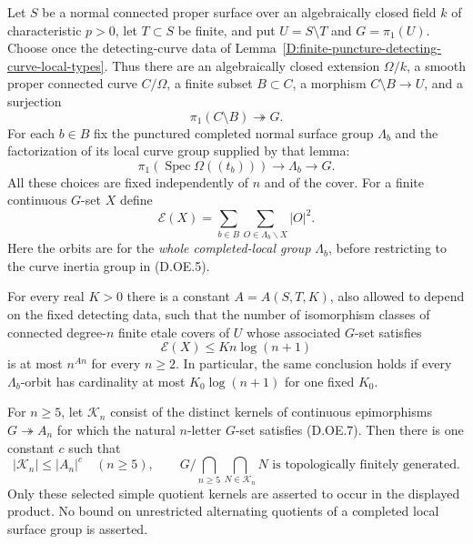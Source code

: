 \begin{theorem}
\label{D:finite-puncture-local-orbit-factorial-count}
Let $S$ be a normal connected proper surface over an algebraically
closed field $k$ of characteristic $p>0$, let $T\subset S$ be finite,
and put $U=S\setminus T$ and $G=\pi_1(U)$.
Choose once the detecting-curve data of
Lemma~\ref{D:finite-puncture-detecting-curve-local-types}.
Thus there are an algebraically closed extension $\Omega/k$, a smooth
proper connected curve $C/\Omega$, a finite subset $B\subset C$,
a morphism $C\setminus B\to U$, and a surjection
\[
                       \pi_1(C\setminus B)\twoheadrightarrow G.
                                                               \tag{D.OE.4}
\]
For each $b\in B$ fix the punctured completed normal surface group
$\Lambda_b$ and the factorization of its local curve group supplied
by that lemma:
\[
 \pi_1(\operatorname{Spec}\Omega((t_b)))
                      \longrightarrow\Lambda_b\longrightarrow G.
                                                               \tag{D.OE.5}
\]
All these choices are fixed independently of $n$ and of the cover.
For a finite continuous $G$-set $X$ define
\[
          \mathcal E(X)=\sum_{b\in B}
                 \sum_{O\in\Lambda_b\backslash X}|O|^2.
                                                               \tag{D.OE.6}
\]
Here the orbits are for the \emph{whole completed-local group}
$\Lambda_b$, before restricting to the curve inertia group in
(D.OE.5).

For every real $K>0$ there is a constant $A=A(S,T,K)$, also allowed
to depend on the fixed detecting data, such that the number of
isomorphism classes of connected degree-$n$ finite etale covers of
$U$ whose associated $G$-set satisfies
\[
                       \mathcal E(X)\le K n\log(n+1)           \tag{D.OE.7}
\]
is at most $n^{A n}$ for every $n\ge2$.
In particular, the same conclusion holds if every $\Lambda_b$-orbit
has cardinality at most $K_0\log(n+1)$ for one fixed $K_0$.

For $n\ge5$, let $\mathcal K_n$ consist of the distinct kernels of
continuous epimorphisms $G\twoheadrightarrow A_n$ for which the
natural $n$-letter $G$-set satisfies (D.OE.7). Then there is one
constant $c$ such that
\[
                   |\mathcal K_n|\le |A_n|^c\quad(n\ge5),
       \qquad
          G\Big/\bigcap_{n\ge5}\bigcap_{N\in\mathcal K_n}N
             \text{ is topologically finitely generated}.    \tag{D.OE.8}
\]
Only these selected simple quotient kernels are asserted to occur
in the displayed product. No bound on unrestricted alternating
quotients of a completed local surface group is asserted.
\end{theorem}
